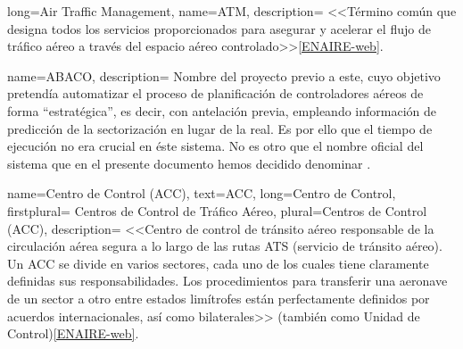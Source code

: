 \makeglossaries

%
%
%        
%

%
%
%        
%



{
    long={Air Traffic Management}, %
    name={ATM}, 
    description=
    {
       <<Término común que designa todos los servicios proporcionados para asegurar y acelerar el flujo de tráfico 
       aéreo a través del espacio aéreo controlado>>\cref{ENAIRE-web}. 
    }
}

{
    name={ABACO},
    description=
    {   
        Nombre del proyecto previo a este, cuyo objetivo pretendía automatizar el proceso de planificación de controladores aéreos de forma ``estratégica'', es decir, con antelación previa, empleando información de predicción de la sectorización en lugar de la real. Es por ello que el tiempo de ejecución no era crucial en éste sistema.
        No es otro que el nombre oficial del sistema que en el presente documento hemos decidido denominar \legacy{}.
    }
}

{
    name={Centro de Control (ACC)},
    text={ACC},
	long={Centro de Control}, %
	firstplural= {Centros de Control de Tráfico Aéreo},
	plural={Centros de Control (ACC)},
    description=
    {
        <<Centro de control de tránsito aéreo responsable de la circulación aérea segura a lo largo de las rutas ATS 
        (servicio de tránsito aéreo). Un ACC se divide en varios sectores, cada uno de los cuales tiene claramente 
        definidas sus responsabilidades. Los procedimientos para transferir una aeronave de un sector a otro entre 
        estados limítrofes están perfectamente definidos por acuerdos internacionales, así como 
        bilaterales>> (también como Unidad de Control)\cref{ENAIRE-web}.
    }
}

